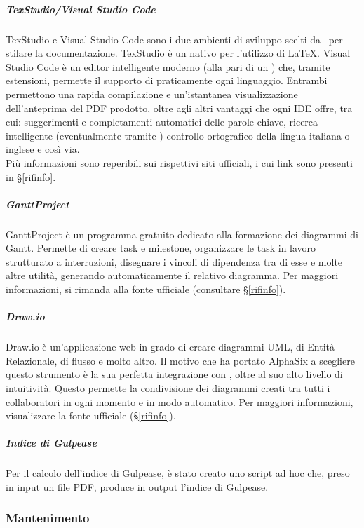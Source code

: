 			\subparagraph{TexStudio/Visual Studio Code}
			TexStudio e Visual Studio Code sono i due ambienti di sviluppo scelti da \gruppo\ per stilare la documentazione.
			TexStudio è un  nativo per l'utilizzo di \LaTeX. Visual Studio Code è un editor intelligente moderno (alla pari di un ) che, tramite
			estensioni, permette il supporto di praticamente ogni linguaggio.
			Entrambi permettono una rapida compilazione e un'istantanea visualizzazione dell'anteprima del PDF prodotto, oltre agli altri vantaggi che ogni IDE offre,
			tra cui: suggerimenti e completamenti automatici delle parole chiave, ricerca intelligente (eventualmente tramite ) controllo ortografico della
			lingua italiana o inglese e così via.\\
			Più informazioni sono reperibili sui rispettivi siti ufficiali, i cui link sono presenti in \S\ref{rifinfo}.

			\subparagraph{GanttProject}
			GanttProject è un programma gratuito dedicato alla formazione dei diagrammi di Gantt. Permette di creare task e milestone, organizzare le task in lavoro strutturato a interruzioni, disegnare i vincoli di dipendenza tra di esse e molte altre utilità, generando automaticamente il relativo diagramma.
			Per maggiori informazioni, si rimanda alla fonte ufficiale (consultare \S\ref{rifinfo}).

			\subparagraph{Draw.io}
			Draw.io è un'applicazione web in grado di creare diagrammi UML, di Entità-Relazionale, di flusso e molto altro. Il motivo che ha portato AlphaSix
			a scegliere questo strumento è la sua perfetta integrazione con , oltre al suo alto livello di intuitività.
			Questo permette la condivisione dei diagrammi creati tra tutti i collaboratori in ogni momento e in modo automatico.
			Per maggiori informazioni, visualizzare la fonte ufficiale (\S\ref{rifinfo}).

			\subparagraph{Indice di Gulpease}
			Per il calcolo dell'indice di Gulpease, è stato creato uno script ad hoc che, preso in input un file PDF, produce in output l'indice di Gulpease.

		\subsubsection{Mantenimento}

